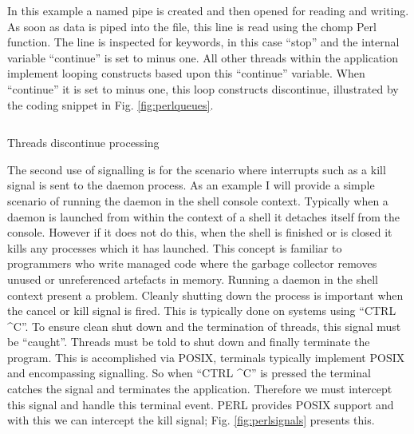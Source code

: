 		\vspace{5mm}
		\normalsize
		{
			In this example a named pipe is created and then opened for reading and writing.  As soon as data is piped into the file, this line is read using the chomp Perl function.
			The line is inspected for keywords, in this case ``stop'' and the internal variable ``continue'' is set to minus one.  All other threads within the application
			implement looping constructs based upon this ``continue'' variable.  When ``continue'' it is set to minus one,  this loop constructs discontinue, illustrated by the coding snippet in Fig. \ref{fig:perlqueues}.
		} 
				
		\begin{figurehere}
			\inputminted[linenos=true,fontsize=\footnotesize,tabsize=2]{perl}{pages/chapter3/smippets/threadscont.pl}
			\vspace{-2mm}
			\caption{Threads discontinue processing}
			\label{fig:perlqueues}
		\end{figurehere}
		
		\vspace{4mm}
		\normalsize
		{
			The second use of signalling is for the scenario where interrupts such as a kill signal is sent to the daemon process.
			As an example I will provide a simple scenario of running the daemon in the shell console context. Typically when a daemon is launched from within
			the context of a shell it detaches itself from the console.  However if it does not do this, when the shell is finished or is closed 
			it kills any processes which it has launched.  This concept is familiar to programmers
			who write managed code where the garbage collector removes unused or unreferenced artefacts in memory.
			\newline
			\newline
			Running a daemon in the shell context present a problem.  Cleanly shutting down the process is important when the cancel or kill signal is fired.
			This is typically done on systems using ``CTRL \textasciicircum  C''.  To ensure clean shut down and the termination of threads, this signal must be ``caught''.
			Threads must be told to shut down and finally terminate the program.
			\newline
			\newline
			This is accomplished via POSIX,  terminals typically implement POSIX and encompassing signalling.  So when ``CTRL \textasciicircum  C'' is 
			pressed the terminal catches the signal and terminates the application.  Therefore we must intercept this signal and handle this terminal event.  
			PERL provides POSIX support and with this we can intercept the kill signal;  Fig. \ref{fig:perlsignals} presents this.
			\newline
		} 
		
